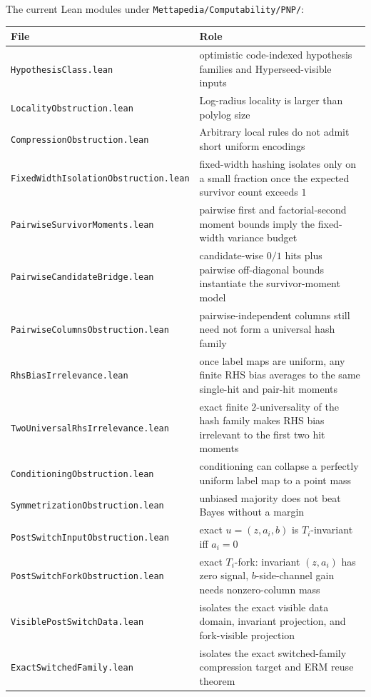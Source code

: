 \documentclass[11pt]{article}
\theoremstyle{remark}
\begin{document}
The current Lean modules under
\texttt{Mettapedia/Computability/PNP/}:
\begin{center}
\begin{tabular}{ll}
\toprule
\textbf{File} & \textbf{Role} \\
\midrule
\texttt{HypothesisClass.lean} & optimistic code-indexed hypothesis families and Hyperseed-visible inputs \\
\texttt{LocalityObstruction.lean} & Log-radius locality is larger than polylog size \\
\texttt{CompressionObstruction.lean} & Arbitrary local rules do not admit short uniform encodings \\
\texttt{FixedWidthIsolationObstruction.lean} & fixed-width hashing isolates only on a small fraction once the expected survivor count exceeds \(1\) \\
\texttt{PairwiseSurvivorMoments.lean} & pairwise first and factorial-second moment bounds imply the fixed-width variance budget \\
\texttt{PairwiseCandidateBridge.lean} & candidate-wise \(0/1\) hits plus pairwise off-diagonal bounds instantiate the survivor-moment model \\
\texttt{PairwiseColumnsObstruction.lean} & pairwise-independent columns still need not form a universal hash family \\
\texttt{RhsBiasIrrelevance.lean} & once label maps are uniform, any finite RHS bias averages to the same single-hit and pair-hit moments \\
\texttt{TwoUniversalRhsIrrelevance.lean} & exact finite \(2\)-universality of the hash family makes RHS bias irrelevant to the first two hit moments \\
\texttt{ConditioningObstruction.lean} & conditioning can collapse a perfectly uniform label map to a point mass \\
\texttt{SymmetrizationObstruction.lean} & unbiased majority does not beat Bayes without a margin \\
\texttt{PostSwitchInputObstruction.lean} & exact \(u=(z,a_i,b)\) is \(T_i\)-invariant iff \(a_i=0\) \\
\texttt{PostSwitchForkObstruction.lean} & exact \(T_i\)-fork: invariant \((z,a_i)\) has zero signal, \(b\)-side-channel gain needs nonzero-column mass \\
\texttt{VisiblePostSwitchData.lean} & isolates the exact visible data domain, invariant projection, and fork-visible projection \\
\texttt{ExactSwitchedFamily.lean} & isolates the exact switched-family compression target and ERM reuse theorem \\

\end{tabular}
\end{center}
\end{document}
